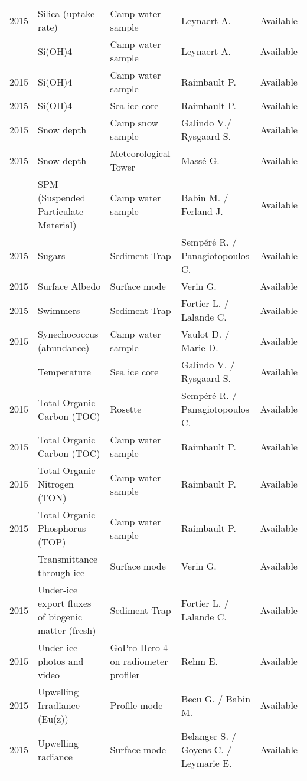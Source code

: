 \documentclass[]{article}
\begin{document}
\begin{landscape}
\begin{longtable}{rllll}
2015 & Silica (uptake rate) & Camp water sample & Leynaert A. & Available\\
\addlinespace
2015 & Si(OH)4 & Camp water sample & Leynaert A. & Available\\
2015 & Si(OH)4 & Camp water sample & Raimbault P. & Available\\
2015 & Si(OH)4 & Sea ice core & Raimbault P. & Available\\
2015 & Snow depth & Camp snow sample & Galindo V./ Rysgaard S. & Available\\
2015 & Snow depth & Meteorological Tower & Massé G. & Available\\
\addlinespace
2015 & SPM (Suspended Particulate Material) & Camp water sample & Babin M. / Ferland J. & Available\\
2015 & Sugars & Sediment Trap & Sempéré R. / Panagiotopoulos C. & Available\\
2015 & Surface Albedo & Surface mode & Verin G. & Available\\
2015 & Swimmers & Sediment Trap & Fortier L. / Lalande C. & Available\\
2015 & Synechococcus (abundance) & Camp water sample & Vaulot D. / Marie D. & Available\\
\addlinespace
2015 & Temperature & Sea ice core & Galindo V. / Rysgaard S. & Available\\
2015 & Total Organic Carbon (TOC) & Rosette & Sempéré R. / Panagiotopoulos C. & Available\\
2015 & Total Organic Carbon (TOC) & Camp water sample & Raimbault P. & Available\\
2015 & Total Organic Nitrogen (TON) & Camp water sample & Raimbault P. & Available\\
2015 & Total Organic Phosphorus (TOP) & Camp water sample & Raimbault P. & Available\\
\addlinespace
2015 & Transmittance through ice & Surface mode & Verin G. & Available\\
2015 & Under-ice export fluxes of biogenic matter (fresh) & Sediment Trap & Fortier L. / Lalande C. & Available\\
2015 & Under-ice photos and video & GoPro Hero 4 on radiometer profiler & Rehm E. & Available\\
2015 & Upwelling Irradiance (Eu(z)) & Profile mode & Becu G. / Babin M. & Available\\
2015 & Upwelling radiance & Surface mode & Belanger S. / Goyens C. / Leymarie E. & Available\\
\addlinespace

\end{longtable}
\end{landscape}
\end{document}
